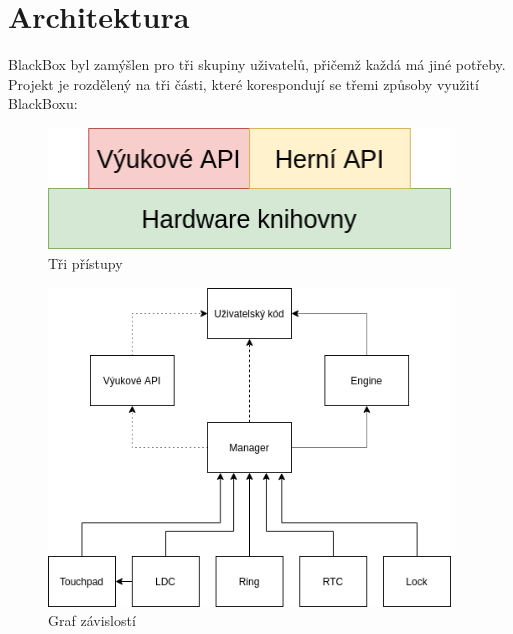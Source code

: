 \chapter{Architektura}

BlackBox byl zamýšlen pro tři skupiny uživatelů, přičemž každá má jiné potřeby.
Projekt je rozdělený na tři části, které korespondují se třemi způsoby využití BlackBoxu:

\begin{figure}[h]
    \begin{small}
        \begin{center}
            \includegraphics[width=0.95\textwidth]{img/Pyramida2.png}
        \end{center}
        \caption{Tři přístupy}
        \label{fig:Pyramida2}
    \end{small}
\end{figure}

\begin{figure}
    \begin{small}
        \begin{center}
            \includegraphics[width=0.95\textwidth]{img/Everything.png}
        \end{center}
        \caption{Graf závislostí}
        \label{fig:everything}
    \end{small}
\end{figure}


